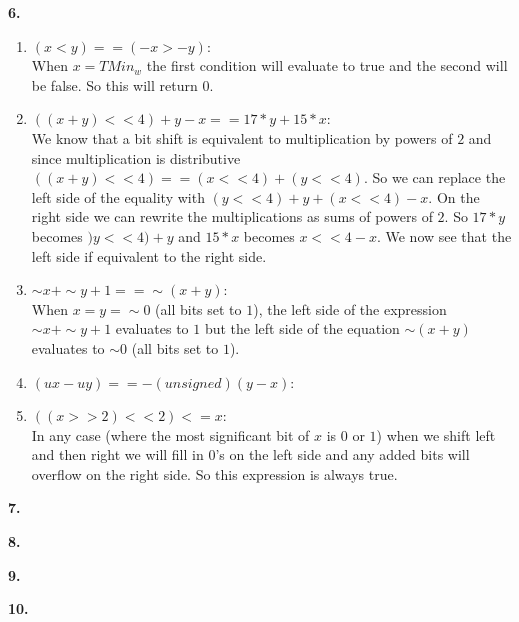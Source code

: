 \documentclass[11pt]{article} %
\begin{document}
\pagebreak
\vspace{0.5in}
{\bf 6.}
\begin{enumerate}[label=\alph*)]
\item
$(x < y) == (-x > -y)$: \\
When $x = TMin_w$ the first condition will evaluate to true and the second will be false. So this will return $0$.

\item
$((x+y)<<4) + y-x == 17*y+15*x$: \\
We know that a bit shift is equivalent to multiplication by powers of $2$ and since multiplication is distributive $((x+y)<<4) == (x << 4) + (y << 4)$. So we can replace the left side of the equality with $(y << 4) + y + (x << 4) - x$.  On the right side we can rewrite the multiplications as sums of powers of $2$. So $17*y$ becomes $)y << 4) + y$ and $15*x$ becomes $x << 4 - x$. We now see that the left side if equivalent to the right side.

\item
$\sim x+ \sim y+1 == \sim (x+y)$: \\
When $x = y = \sim 0$ (all bits set to $1$), the left side of the expression $\sim x+ \sim y+1$ evaluates to $1$ but the left side of the equation $\sim (x + y)$ evaluates to $\sim 0$ (all bits set to $1$).

\item
$(ux-uy) == -(unsigned)(y-x)$:


\item
$((x >> 2) << 2) <= x$: \\
In any case (where the most significant bit of $x$ is $0$ or $1$) when we shift left and then right we will fill in $0$'s on the left side and any added bits will overflow on the right side. So this expression is always true.

\end{enumerate}

{\bf 7.}


{\bf 8.}

{\bf 9.}

{\bf 10.}
\end{document}
